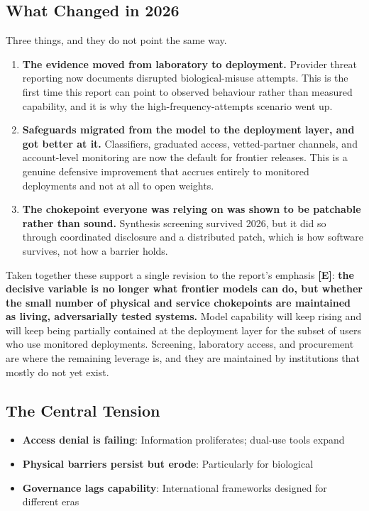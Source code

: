 \documentclass[11pt,letterpaper]{article}
\begin{document}
\subsection{What Changed in 2026}

Three things, and they do not point the same way.

\begin{enumerate}
  \item \textbf{The evidence moved from laboratory to deployment.} Provider threat reporting now documents disrupted biological-misuse attempts. This is the first time this report can point to observed behaviour rather than measured capability, and it is why the high-frequency-attempts scenario went up.
  \item \textbf{Safeguards migrated from the model to the deployment layer, and got better at it.} Classifiers, graduated access, vetted-partner channels, and account-level monitoring are now the default for frontier releases. This is a genuine defensive improvement that accrues entirely to monitored deployments and not at all to open weights.
  \item \textbf{The chokepoint everyone was relying on was shown to be patchable rather than sound.} Synthesis screening survived 2026, but it did so through coordinated disclosure and a distributed patch, which is how software survives, not how a barrier holds.
\end{enumerate}

\begin{keybox}
Taken together these support a single revision to the report's emphasis \textbf{[E]}: \textbf{the decisive variable is no longer what frontier models can do, but whether the small number of physical and service chokepoints are maintained as living, adversarially tested systems.} Model capability will keep rising and will keep being partially contained at the deployment layer for the subset of users who use monitored deployments. Screening, laboratory access, and procurement are where the remaining leverage is, and they are maintained by institutions that mostly do not yet exist.
\end{keybox}

\subsection{The Central Tension}

\begin{itemize}
  \item \textbf{Access denial is failing}: Information proliferates; dual-use tools expand
  \item \textbf{Physical barriers persist but erode}: Particularly for biological
  \item \textbf{Governance lags capability}: International frameworks designed for different eras
\end{itemize}
\end{document}
